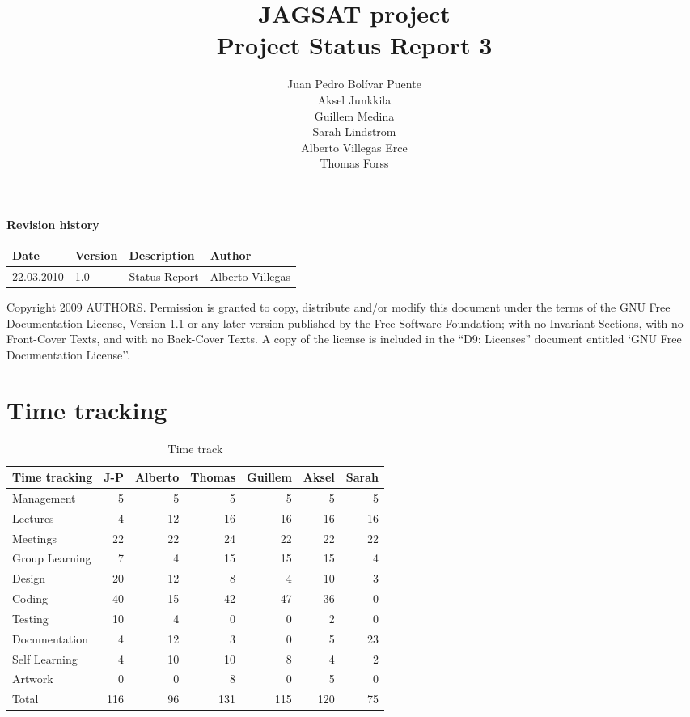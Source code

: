 \documentclass[12pt,a4paper]{article}
\title{\large JAGSAT project\\\huge Project Status Report 3}
\author{
  Juan Pedro Bolívar Puente\\ 
  Aksel Junkkila\\
  Guillem Medina\\ 
  Sarah Lindstrom\\ 
  Alberto Villegas Erce\\ 
  Thomas Forss
}
\begin{document}
\maketitle

\begin{center}
\textbf{Revision history}

\begin{tabular}{ l | l | l | l }
Date			&Version	&Description		&Author\\\hline\hline
22.03.2010	&1.0		&Status Report		&Alberto Villegas
\end{tabular}
\label{tab:rev}
\end{center}

\vfill
Copyright 2009 AUTHORS.
Permission is granted to copy, distribute and/or modify this document under the terms of the GNU Free Documentation License, Version 1.1 or any later version published by the Free Software Foundation;  with no Invariant Sections, with no Front-Cover Texts, and with no Back-Cover Texts. A copy of the license is included in the ``D9: Licenses''  document entitled `GNU Free Documentation License''.

\pagebreak
\tableofcontents
\pagebreak

\section{Time tracking}

\begin{table}[h!]
\small
\begin{tabular}{ l | r | r | r | r | r | r}
Time tracking	&J-P	&Alberto	&Thomas	&Guillem	&Aksel	&Sarah\\\hline\hline
Management	&5	&5		&5		&5		&5		&5\\
Lectures		&4	&12		&16		&16		&16		&16\\
Meetings		&22	&22		&24		&22		&22		&22\\
Group Learning&7	&4		&15		&15		&15		&4\\
Design		&20	&12		&8		&4		&10		&3\\
Coding		&40	&15		&42		&47		&36		&0\\
Testing		&10	&4		&0		&0		&2		&0\\
Documentation&4	&12		&3		&0		&5		&23\\
Self Learning	&4	&10		&10		&8		&4		&2\\
Artwork		&0	&0		&8		&0		&5		&0\\
Total			&116&96		&131	&115	&120	&75
\end{tabular}
\caption{Time track}
\label{tab:timetrack}
\end{table}
\end{document}
